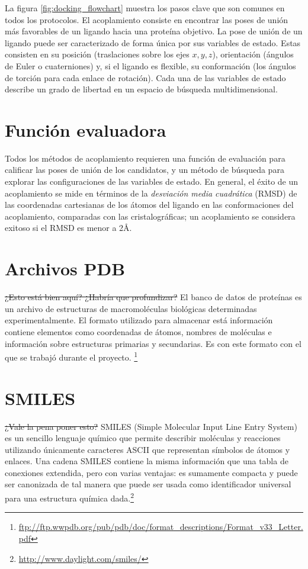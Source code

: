 La figura \ref{fig:docking_flowchart} muestra los pasos clave que son comunes en
todos los protocolos. El acoplamiento consiste en encontrar las poses de unión
más favorables de un ligando hacia una proteína objetivo. La
pose de unión de un ligando puede ser caracterizado de forma única por sus
variables de estado. Estas consisten en su posición (traslaciones sobre los ejes
$x, y, z$), orientación (ángulos de Euler o cuaterniones) y, si el ligando es
flexible, su conformación (los ángulos de torción para cada enlace de
rotación). Cada una de las variables de estado describe un grado de libertad en
un espacio de búsqueda multidimensional.

\section{Función evaluadora}
Todos los métodos de acoplamiento requieren una función de evaluación
para calificar las poses de unión de los candidatos, y un método
de búsqueda para explorar las configuraciones de las variables de
estado. En general, el éxito de un acoplamiento se mide en términos de
la \textit{desviación media cuadrática} (RMSD) de las coordenadas
cartesianas de los átomos del ligando en las conformaciones del
acoplamiento, comparadas con las cristalográficas; un acoplamiento se
considera exitoso si el RMSD es menor a 2\AA.

\section{Archivos PDB}
\sout{¿Esto está bien aquí? ¿Habría que profundizar?}
El banco de datos de proteínas es un archivo de estructuras de macromoléculas
biológicas determinadas experimentalmente. El formato utilizado para almacenar
está información contiene elementos como coordenadas de átomos, nombres de
moléculas e información sobre estructuras primarias y secundarias. Es con este
formato con el que se trabajó durante el proyecto.
\footnote{\url{ftp://ftp.wwpdb.org/pub/pdb/doc/format_descriptions/Format_v33_Letter.pdf}}

\section{SMILES}
\sout{¿Vale la pena poner esto?}
SMILES (Simple Molecular Input Line Entry System) es un sencillo lenguaje
químico que permite describir moléculas y reacciones utilizando únicamente
caracteres ASCII que representan símbolos de átomos y enlaces. Una cadena SMILES
contiene la misma información que una tabla de conexiones extendida, pero con
varias ventajas: es sumamente compacta y puede ser canonizada de tal manera
que puede ser usada como identificador universal para una estructura química
dada.\footnote{\url{http://www.daylight.com/smiles/}}
